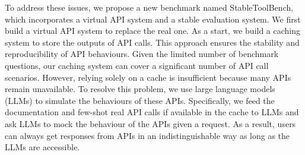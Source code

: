 

To address these issues, we propose a new benchmark named StableToolBench, which incorporates a virtual API system and a stable evaluation system. 
 We first build a virtual API system to replace the real one. As a start, we build a caching system to store the outputs of API calls. This approach ensures the stability and reproducibility of API behaviours. Given the limited number of benchmark questions, our caching system can cover a significant number of API call scenarios.
However, relying solely on a cache is insufficient because many APIs remain unavailable. To resolve this problem, we use large language models (LLMs) to simulate the behaviours of these APIs.
Specifically, we feed the documentation and few-shot real API calls if available in the cache to LLMs and ask LLMs to mock the behaviour of the APIs given a request. 
As a result, users can always get responses from APIs in an indistinguishable way as long as the LLMs are accessible. 
